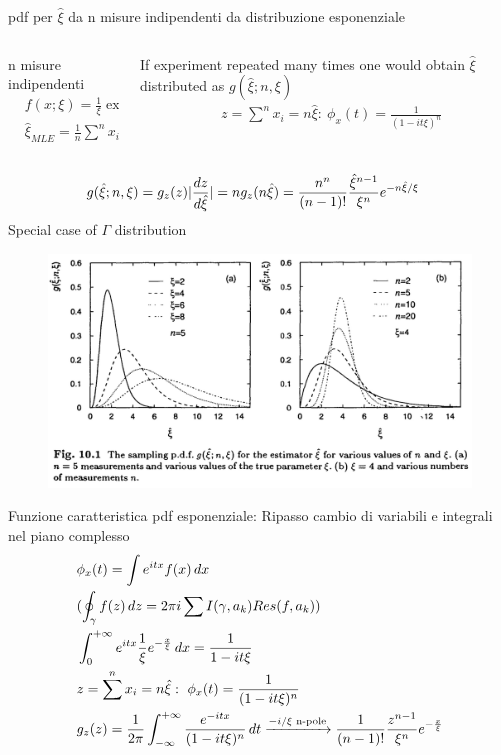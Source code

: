 \documentclass[asd-beamer.tex]{subfiles}%
\begin{document}
\begin{frame}{pdf per $\hat{\xi}$ da n misure indipendenti da distribuzione esponenziale}
\begin{columns}[T]\begin{column}{0.4\textwidth}
n misure indipendenti
\begin{align*}
&f(x;\xi)=\frac{1}{\xi}\exp{-\frac{x}{\xi}}\\
&\hat{\xi}_{MLE}=\frac{1}{n}\sum^nx_i
\end{align*}
\end{column}\begin{column}{0.6\textwidth}
If experiment repeated many times one would obtain $\hat{\xi}$ distributed as $g(\hat{\xi};n,\xi)$
\begin{align*}
&z=\sum^nx_i=n\hat{\xi}:\ \phi_x(t)=\frac{1}{(1-it\xi)^n}
\end{align*}
\end{column}\end{columns}
\begin{align*}
&g(\hat{\xi};n,\xi)=g_z(z)|\frac{d z}{d \hat{\xi}}|=ng_z(n\hat{\xi})=\frac{n^n}{(n-1)!}\frac{\hat{\xi}^{n-1}}{\xi^n}e^{-n\hat{\xi}/\xi}
\end{align*}
Special case of $\Gamma$ distribution
\begin{figure}[!ht]\includegraphics[trim={0cm 0cm 0 0},clip, keepaspectratio,height=0.4\textheight]{figures/cowan/estimators/pdfestexp}\label{fig:pdfestexp}\end{figure}
\end{frame}

\begin{wordonframe}{Funzione caratteristica pdf esponenziale: Ripasso cambio di variabili e integrali nel piano complesso}
\begin{align*}
&\phi_x(t)=\int e^{itx}f(x)\,dx\\
&(\oint_{\gamma}f(z)\,dz=2\pi i\sum I(\gamma,a_k)Res(f,a_k))\\
&\int_{0}^{+\infty}{}e^{itx}\frac{1}{\xi}e^{-\frac{x}{\xi}}\,dx=\frac{1}{1-it\xi}\\
&z=\sum^nx_i=n\hat{\xi}:\ \phi_x(t)=\frac{1}{(1-it\xi)^n}\\
&g_z(z)=\frac{1}{2\pi}\int_{-\infty}^{+\infty}{}\frac{e^{-itx}}{(1-it\xi)^n}\,dt\xrightarrow{-i/\xi \text{ n-pole}}\frac{1}{(n-1)!}\frac{z^{n-1}}{\xi^n}e^{-\frac{x}{\xi}}\\
\end{align*}
\end{wordonframe}
\end{document}
